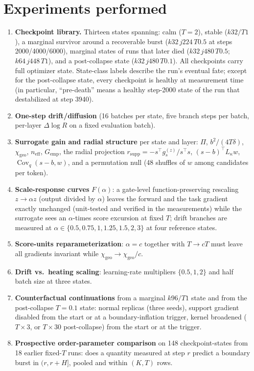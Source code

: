 \documentclass[11pt,a4paper]{article}
\newcommand{\neff}{n_{\mathrm{eff}}}
\newcommand{\chigeo}{\chi_{\mathrm{geo}}}
\newcommand{\Pisurr}{\Pi}
\begin{document}
\section{Experiments performed}

\begin{enumerate}[leftmargin=1.6em]
\item \textbf{Checkpoint library.} Thirteen states spanning: calm
(\(T{=}2\)), stable (\(k32/T1\)), a marginal survivor around a recoverable
burst (\(k32\,j224\,T0.5\) at steps 2000/4000/6000), marginal states of runs
that later died (\(k32\,j480\,T0.5\); \(k64\,j448\,T1\)), and a post-collapse
state (\(k32\,j480\,T0.1\)). All checkpoints carry full optimizer state.
State-class labels describe the run's eventual fate; except for the
post-collapse state, every checkpoint is healthy at measurement time (in
particular, ``pre-death'' means a healthy step-2000 state of the run that
destabilized at step 3940).
\item \textbf{One-step drift/diffusion} (16 batches per state, five branch
steps per batch, per-layer \(\Delta \log R\) on a fixed evaluation batch).
\item \textbf{Surrogate gain and radial structure} per state and layer:
\(\Pisurr\), \(b^2/(4T\delta)\), \(\chigeo\), \(\neff\), \(G_{\mathrm{emp}}\),
the radial projection \(r_{\mathrm{supp}} = -s^{\top} g_s^{(z)} / s^{\top}s\),
\((s-b)^{\top}L_\kappa w\), \(\operatorname{Cov}_q(s{-}b, w)\), and a
permutation null (48 shuffles of \(w\) among candidates per token).
\item \textbf{Scale-response curves} \(F(\alpha)\): a gate-level
function-preserving rescaling \(z \to \alpha z\) (output divided by
\(\alpha\)) leaves the forward and the task gradient exactly unchanged
(unit-tested and verified in the measurements) while the surrogate sees an
\(\alpha\)-times score excursion at fixed \(T\); drift branches are measured
at \(\alpha \in \{0.5, 0.75, 1, 1.25, 1.5, 2, 3\}\) at four reference states.
\item \textbf{Score-units reparameterization}: \(\alpha = c\) together with
\(T \to cT\) must leave all gradients invariant while \(\chigeo \to
\chigeo/c\).
\item \textbf{Drift vs.\ heating scaling}: learning-rate multipliers
\(\{0.5, 1, 2\}\) and half batch size at three states.
\item \textbf{Counterfactual continuations} from a marginal \(k96/T1\) state
and from the post-collapse \(T{=}0.1\) state: normal replicas (three seeds),
support gradient disabled from the start or at a boundary-inflation trigger,
kernel broadened (\(T \times 3\), or \(T \times 30\) post-collapse) from the
start or at the trigger.
\item \textbf{Prospective order-parameter comparison} on 148
checkpoint-states from 18 earlier fixed-\(T\) runs: does a quantity measured
at step \(r\) predict a boundary burst in \((r, r{+}H]\), pooled and within
\((K,T)\) rows.
\end{enumerate}
\end{document}
